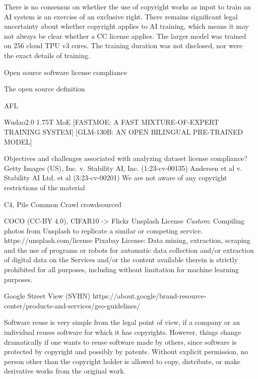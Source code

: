 There is no consensus on whether the use of copyright works as input to train an AI system is an exercise of an exclusive right.
There remains significant legal uncertainty about whether copyright applies to AI training, which means it may not always be clear whether a CC license applies.
The larger model was trained on 256 cloud TPU v3 cores. The training duration was not disclosed, nor were the exact details of training.

Open source software license compliance~\cite{ombredanne2020free}

The open source definition~\cite{perens1999open}

AFL~\cite{rosen2005open}

Wudao2.0 1.75T MoE
[FASTMOE: A FAST MIXTURE-OF-EXPERT TRAINING SYSTEM]
[GLM-130B: AN OPEN BILINGUAL PRE-TRAINED MODEL]

Objectives and challenges associated with analyzing dataset license compliance?
Getty Images (US), Inc. v. Stability AI, Inc. (1:23-cv-00135)
Andersen et al v. Stability AI Ltd. et al (3:23-cv-00201)
We are not aware of any copyright restrictions of the material

C4, Pile Common Crawl
crowdsourced

COCO (CC-BY 4.0), CIFAR10 -> Flickr
Unsplash License \textit{Custom}: Compiling photos from Unsplash to replicate a similar or competing service. https://unsplash.com/license
Pixabay License: Data mining, extraction, scraping and the use of programs or robots for automatic data collection and/or extraction of digital data on the Services and/or the content available therein is strictly prohibited for all purposes, including without limitation for machine learning purposes.

Google Street View (SVHN) https://about.google/brand-resource-center/products-and-services/geo-guidelines/



Software reuse is very simple from the legal point of view, if a company or an
individual reuses software for which it has copyrights. However, things change dramatically
if one wants to reuse software made by others, since software is protected
by copyright and possibly by patents. Without explicit permission, no person other
than the copyright holder is allowed to copy, distribute, or make derivative works
from the original work.



